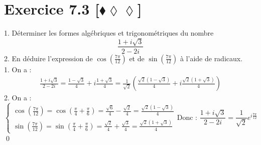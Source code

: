 \documentclass[10pt]{article}
\begin{document}

\section*{Exercice 7.3 [$\blacklozenge\lozenge\lozenge$]}
\begin{tcolorbox}[enhanced, width=7in, center, size=fbox, fontupper=\large, drop shadow southwest]
    1. Déterminer les formes algébriques et trigonométriques du nombre
    \begin{equation*}
        \frac{1+i\sqrt{3}}{2-2i}
    \end{equation*}
    2. En déduire l'expression de $\cos(\frac{7\pi}{12})$ et de $\sin(\frac{7\pi}{12})$ à l'aide de radicaux.\\[0.25cm]
    1. On a :
    \begin{align*}
        \frac{1+i\sqrt{3}}{2-2i}=\frac{1-\sqrt{3}}{4}+i\frac{1+\sqrt{3}}{4}=\frac{1}{\sqrt{2}}\left(\frac{\sqrt{2}(1-\sqrt{3})}{4}+i\frac{\sqrt{2}(1+\sqrt{3})}{4}\right)
    \end{align*}
    2. On a :
    \begin{equation*}
        \begin{cases}
            \cos(\frac{7\pi}{12})=\cos(\frac{\pi}{4}+\frac{\pi}{6})=\frac{\sqrt{6}}{4}-\frac{\sqrt{2}}{4}=\frac{\sqrt{2}(1-\sqrt{3})}{4}\\
            \sin(\frac{7\pi}{12})=\sin(\frac{\pi}{4}+\frac{\pi}{6})=\frac{\sqrt{2}}{4}+\frac{\sqrt{3}}{4}=\frac{\sqrt{2}(1+\sqrt{3})}{4}
        \end{cases}
        \text{Donc : }\frac{1+i\sqrt{3}}{2-2i}=\frac{1}{\sqrt{2}}e^{i\frac{7\pi}{12}}
    \end{equation*}
    \qed
\end{tcolorbox}

\end{document}

